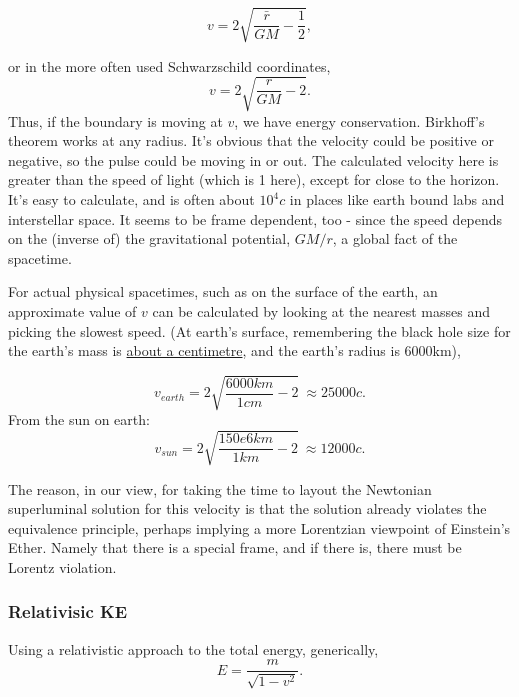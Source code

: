 \documentclass[../rzero]{subfiles}
\begin{document}
\begin{equation}
 v = 2 \sqrt{\frac{\bar r}{G M} - \frac{1}{2}},
\end{equation}

or in the more often used Schwarzschild coordinates,
\begin{equation}
 v = 2 \sqrt{\frac{r}{G M} - 2}.
\end{equation}
Thus, if the boundary is moving at $v$, we have energy conservation. Birkhoff's theorem works at any radius. It's obvious that the velocity could be positive or negative, so the pulse could be moving in or out. The calculated velocity here is greater than the speed of light (which is 1 here), except for close to the horizon. It's easy to calculate, and is often about $10^4c$ in places like earth bound labs and interstellar space. It seems to be frame dependent, too - since the speed depends on the (inverse of) the gravitational potential, $GM/r$, a global fact of the spacetime. 

For actual physical spacetimes, such as on the surface of the earth, an approximate value of $v$ can be calculated by looking at the nearest masses and picking the slowest speed. (At earth's surface, remembering the black hole size for the earth's mass is \href{https://www.wolframalpha.com/input?i=G*%28mass+of+earth%29%2Fc%5E2}{about a centimetre}, and the earth's radius is 6000km), 

\begin{equation}
 v_{earth} = 2 \sqrt{\frac{6000km}{1 cm} - 2} \ \approx 25000c .
\end{equation}
From the sun on earth:
\begin{equation}
 v_{sun} = 2 \sqrt{\frac{150e6km}{1 km} - 2} \ \approx 12000c .
\end{equation}

The reason, in our view, for taking the time to layout the Newtonian superluminal solution for this velocity is that the solution already violates the equivalence principle, perhaps implying a more Lorentzian viewpoint  of Einstein's Ether\cite{Einstein1920}. Namely that there is a special frame, and if there is, there must be Lorentz violation.  



\subsubsection{Relativisic KE}
Using a relativistic approach to the total energy, generically, 
\begin{equation}
 E = \frac{m}{\sqrt{1 - v^2}}.
\end{equation}
\end{document}
